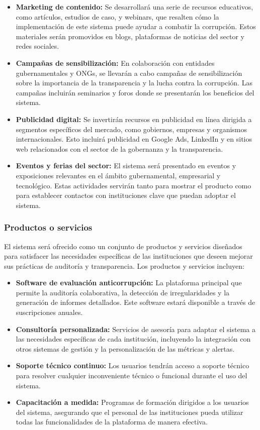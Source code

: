 \documentclass[a4paper,12pt]{article}
\begin{document}
\begin{itemize}
    \item \textbf{Marketing de contenido:} Se desarrollará una serie de recursos educativos, como artículos, estudios de caso, y webinars, que resalten cómo la implementación de este sistema puede ayudar a combatir la corrupción. Estos materiales serán promovidos en blogs, plataformas de noticias del sector y redes sociales.
    \item \textbf{Campañas de sensibilización:} En colaboración con entidades gubernamentales y ONGs, se llevarán a cabo campañas de sensibilización sobre la importancia de la transparencia y la lucha contra la corrupción. Las campañas incluirán seminarios y foros donde se presentarán los beneficios del sistema.
    \item \textbf{Publicidad digital:} Se invertirán recursos en publicidad en línea dirigida a segmentos específicos del mercado, como gobiernos, empresas y organismos internacionales. Esto incluirá publicidad en Google Ads, LinkedIn y en sitios web relacionados con el sector de la gobernanza y la transparencia.
    \item \textbf{Eventos y ferias del sector:} El sistema será presentado en eventos y exposiciones relevantes en el ámbito gubernamental, empresarial y tecnológico. Estas actividades servirán tanto para mostrar el producto como para establecer contactos con instituciones clave que puedan adoptar el sistema.
\end{itemize}

\subsubsection{Productos o servicios}
El sistema será ofrecido como un conjunto de productos y servicios diseñados para satisfacer las necesidades específicas de las instituciones que deseen mejorar sus prácticas de auditoría y transparencia. Los productos y servicios incluyen:

\begin{itemize}
    \item \textbf{Software de evaluación anticorrupción:} La plataforma principal que permite la auditoría colaborativa, la detección de irregularidades y la generación de informes detallados. Este software estará disponible a través de suscripciones anuales.
    \item \textbf{Consultoría personalizada:} Servicios de asesoría para adaptar el sistema a las necesidades específicas de cada institución, incluyendo la integración con otros sistemas de gestión y la personalización de las métricas y alertas.
    \item \textbf{Soporte técnico continuo:} Los usuarios tendrán acceso a soporte técnico para resolver cualquier inconveniente técnico o funcional durante el uso del sistema.
    \item \textbf{Capacitación a medida:} Programas de formación dirigidos a los usuarios del sistema, asegurando que el personal de las instituciones pueda utilizar todas las funcionalidades de la plataforma de manera efectiva.
\end{itemize}
\end{document}
